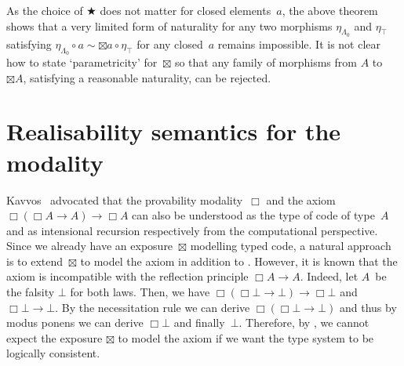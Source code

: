 \documentclass[a4paper,UKenglish,numberwithinsect,cleveref,thm-restate,draft]{lipics-v2021}
\numberwithin{equation}{section}
\theoremstyle{definition}
\theoremstyle{plain}
\begin{document}
%
As the choice of $\bigstar$ does not matter for closed elements~$a$, the above theorem shows that a very limited form of naturality for any two morphisms $\eta_{\Lambda_0}$ and $\eta_\top$ satisfying $\eta_{\Lambda_0} \circ a \sim \boxtimes{a} \circ \eta_{\top}$ for any closed~$a$ remains impossible. 
It is not clear how to state `parametricity' for~$\boxtimes$ so that any family of morphisms from $A$ to $\boxtimes A$, satisfying a reasonable naturality, can be rejected. 

\section{Realisability semantics for the \texorpdfstring{\GL}{GL} modality}\label{sec:GL-modality}

Kavvos~\cite{Kavvos2017b} advocated that the provability modality~$\Box$ and the \GL axiom $\Box(\Box A \to A) \to \Box A$ can also be understood as the type of code of type~$A$ and as intensional recursion respectively from the computational perspective.
Since we already have an exposure~$\boxtimes$ modelling typed code, a natural approach is to extend~$\boxtimes$ to model the \GL axiom in addition to \SFour.
However, it is known that the \GL axiom is incompatible with the reflection principle $\Box A \to A$.
Indeed, let $A$~be the falsity $\bot$ for both laws.
Then, we have $\Box(\Box \bot \to \bot) \to \Box \bot$ and $\Box \bot \to \bot$.
By the necessitation rule we can derive $\Box (\Box \bot \to \bot)$ and thus by modus ponens we can derive $\Box \bot$ and finally~$\bot$.
Therefore, by , we cannot expect the exposure $\boxtimes$ to model the \GL axiom if we want the type system to be logically consistent.
\end{document}
